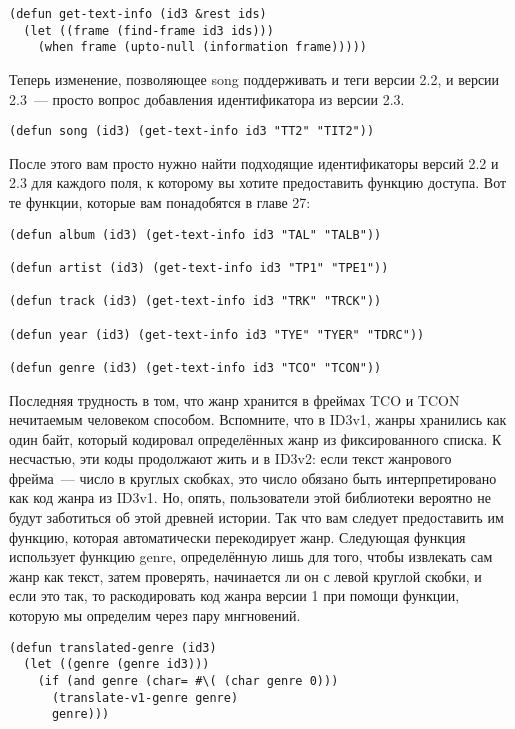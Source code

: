 \begin{lstlisting}
(defun get-text-info (id3 &rest ids)
  (let ((frame (find-frame id3 ids)))
    (when frame (upto-null (information frame)))))
\end{lstlisting}

Теперь изменение, позволяющее song поддерживать и теги версии 2.2, и версии 2.3~--- просто
вопрос добавления идентификатора из версии 2.3.

\begin{lstlisting}
(defun song (id3) (get-text-info id3 "TT2" "TIT2"))
\end{lstlisting}

После этого вам просто нужно найти подходящие идентификаторы версий 2.2 и 2.3 для каждого
поля, к которому вы хотите предоставить функцию доступа. Вот те функции, которые вам
понадобятся в главе 27:

\begin{lstlisting}
(defun album (id3) (get-text-info id3 "TAL" "TALB"))

(defun artist (id3) (get-text-info id3 "TP1" "TPE1"))

(defun track (id3) (get-text-info id3 "TRK" "TRCK"))

(defun year (id3) (get-text-info id3 "TYE" "TYER" "TDRC"))

(defun genre (id3) (get-text-info id3 "TCO" "TCON"))
\end{lstlisting}

Последняя трудность в том, что жанр хранится в фреймах TCO и TCON нечитаемым человеком
способом. Вспомните, что в ID3v1, жанры хранились как один байт, который кодировал
определённых жанр из фиксированного списка. К несчастью, эти коды продолжают жить и в
ID3v2: если текст жанрового фрейма~--- число в круглых скобках, это число обязано быть
интерпретировано как код жанра из ID3v1. Но, опять, пользователи этой библиотеки вероятно
не будут заботиться об этой древней истории. Так что вам следует предоставить им функцию,
которая автоматически перекодирует жанр. Следующая функция использует функцию genre,
определённую лишь для того, чтобы извлекать сам жанр как текст, затем проверять,
начинается ли он с левой круглой скобки, и если это так, то раскодировать код жанра версии
1 при помощи функции, которую мы определим через пару мнгновений.

\begin{lstlisting}
(defun translated-genre (id3)
  (let ((genre (genre id3)))
    (if (and genre (char= #\( (char genre 0)))
      (translate-v1-genre genre)
      genre)))
\end{lstlisting}

